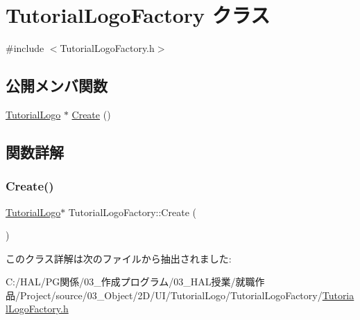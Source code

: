 \hypertarget{class_tutorial_logo_factory}{}\section{Tutorial\+Logo\+Factory クラス}
\label{class_tutorial_logo_factory}


{\ttfamily \#include $<$Tutorial\+Logo\+Factory.\+h$>$}

\subsection*{公開メンバ関数}
\begin{DoxyCompactItemize}
\item 
\mbox{\hyperlink{class_tutorial_logo}{Tutorial\+Logo}} $\ast$ \mbox{\hyperlink{class_tutorial_logo_factory_adc1e80456f8ab75ba30c7a1e9767afd8}{Create}} ()
\end{DoxyCompactItemize}


\subsection{関数詳解}
\mbox{\label{class_tutorial_logo_factory_adc1e80456f8ab75ba30c7a1e9767afd8}} 
\subsubsection{\texorpdfstring{Create()}{Create()}}
{\footnotesize\ttfamily \mbox{\hyperlink{class_tutorial_logo}{Tutorial\+Logo}}$\ast$ Tutorial\+Logo\+Factory\+::\+Create (\begin{DoxyParamCaption}{ }\end{DoxyParamCaption})\hspace{0.3cm}{\ttfamily [inline]}}



このクラス詳解は次のファイルから抽出されました\+:\begin{DoxyCompactItemize}
\item 
C\+:/\+H\+A\+L/\+P\+G関係/03\+\_\+作成プログラム/03\+\_\+\+H\+A\+L授業/就職作品/\+Project/source/03\+\_\+\+Object/2\+D/\+U\+I/\+Tutorial\+Logo/\+Tutorial\+Logo\+Factory/\mbox{\hyperlink{_tutorial_logo_factory_8h}{Tutorial\+Logo\+Factory.\+h}}\end{DoxyCompactItemize}
